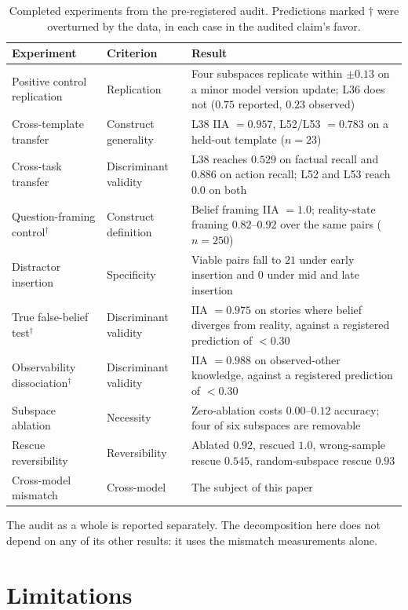 \documentclass{article}
\begin{document}
\begin{table}[t]
\centering
\caption{Completed experiments from the pre-registered audit. Predictions marked $\dagger$ were overturned by the data, in each case in the audited claim's favor.}
\label{tab:audit}
\vspace{0.5\baselineskip}
\begin{tabular}{llp{6.4cm}}
\toprule
Experiment & Criterion & Result \\
\midrule
Positive control replication & Replication & Four subspaces replicate within $\pm 0.13$ on a minor model version update; L36 does not ($0.75$ reported, $0.23$ observed) \\
Cross-template transfer & Construct generality & L38 IIA $= 0.957$, L52/L53 $= 0.783$ on a held-out template ($n = 23$) \\
Cross-task transfer & Discriminant validity & L38 reaches $0.529$ on factual recall and $0.886$ on action recall; L52 and L53 reach $0.0$ on both \\
Question-framing control$^\dagger$ & Construct definition & Belief framing IIA $= 1.0$; reality-state framing $0.82$--$0.92$ over the same pairs ($n = 250$) \\
Distractor insertion & Specificity & Viable pairs fall to $21$ under early insertion and $0$ under mid and late insertion \\
True false-belief test$^\dagger$ & Discriminant validity & IIA $= 0.975$ on stories where belief diverges from reality, against a registered prediction of $< 0.30$ \\
Observability dissociation$^\dagger$ & Discriminant validity & IIA $= 0.988$ on observed-other knowledge, against a registered prediction of $< 0.30$ \\
Subspace ablation & Necessity & Zero-ablation costs $0.00$--$0.12$ accuracy; four of six subspaces are removable \\
Rescue reversibility & Reversibility & Ablated $0.92$, rescued $1.0$, wrong-sample rescue $0.545$, random-subspace rescue $0.93$ \\
Cross-model mismatch & Cross-model & The subject of this paper \\
\bottomrule
\end{tabular}
\end{table}

The audit as a whole is reported separately. The decomposition here does not depend on any of its other results: it uses the mismatch measurements alone.


\section{Limitations}
\end{document}
